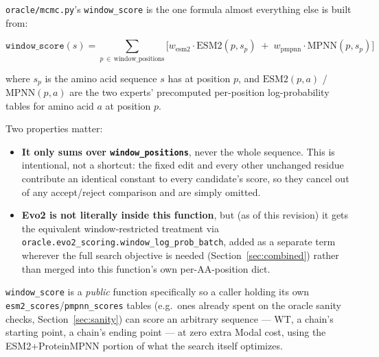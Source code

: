 \documentclass[11pt]{article}
\begin{document}
\texttt{oracle/mcmc.py}'s \texttt{window\_score} is the one formula almost
everything else is built from:

\begin{equation}
  \texttt{window\_score}(s) = \sum_{p \,\in\, \text{window\_positions}}
    \Big[ w_{\text{esm2}} \cdot \text{ESM2}(p, s_p) \;+\; w_{\text{pmpnn}} \cdot \text{MPNN}(p, s_p) \Big]
\end{equation}

where $s_p$ is the amino acid sequence $s$ has at position $p$, and
$\text{ESM2}(p, a)$ / $\text{MPNN}(p, a)$ are the two experts' precomputed
per-position log-probability tables for amino acid $a$ at position $p$.

Two properties matter:

\begin{itemize}
  \item \textbf{It only sums over \texttt{window\_positions}}, never the
    whole sequence. This is intentional, not a shortcut: the fixed edit and
    every other unchanged residue contribute an identical constant to every
    candidate's score, so they cancel out of any accept/reject comparison
    and are simply omitted.
  \item \textbf{Evo2 is not literally inside this function}, but (as of this
    revision) it gets the equivalent window-restricted treatment via
    \texttt{oracle.evo2\_scoring.window\_log\_prob\_batch}, added as a
    separate term wherever the full search objective is needed
    (Section~\ref{sec:combined}) rather than merged into this function's own
    per-AA-position dict.
\end{itemize}

\texttt{window\_score} is a \emph{public} function specifically so a caller
holding its own \texttt{esm2\_scores}/\texttt{pmpnn\_scores} tables (e.g.\
ones already spent on the oracle sanity checks, Section~\ref{sec:sanity}) can
score an arbitrary sequence --- WT, a chain's starting point, a chain's
ending point --- at zero extra Modal cost, using the ESM2+ProteinMPNN portion
of what the search itself optimizes.
\end{document}
